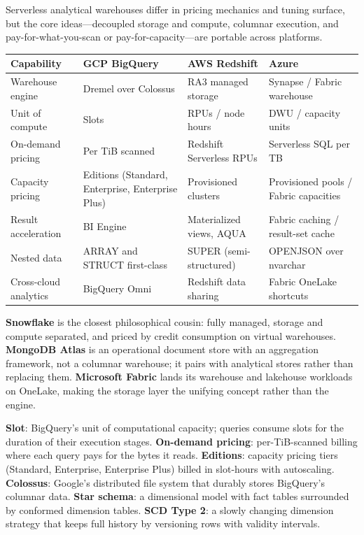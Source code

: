 \begin{crosscloud}
Serverless analytical warehouses differ in pricing mechanics and tuning surface, but the core ideas---decoupled storage and compute, columnar execution, and pay-for-what-you-scan or pay-for-capacity---are portable across platforms.

\vspace{2mm}
{\footnotesize
\begin{tabular}{@{}p{2.8cm}p{3.0cm}p{3.0cm}p{3.0cm}@{}} \\
\toprule
\textbf{Capability} & \textbf{GCP BigQuery} & \textbf{AWS Redshift} & \textbf{Azure} \\
\midrule
Warehouse engine & Dremel over Colossus & RA3 managed storage & Synapse / Fabric warehouse \\
Unit of compute & Slots & RPUs / node hours & DWU / capacity units \\
On-demand pricing & Per TiB scanned & Redshift Serverless RPUs & Serverless SQL per TB \\
Capacity pricing & Editions (Standard, Enterprise, Enterprise Plus) & Provisioned clusters & Provisioned pools / Fabric capacities \\
Result acceleration & BI Engine & Materialized views, AQUA & Fabric caching / result-set cache \\
Nested data & ARRAY and STRUCT first-class & SUPER (semi-structured) & OPENJSON over nvarchar \\
Cross-cloud analytics & BigQuery Omni & Redshift data sharing & Fabric OneLake shortcuts \\
\bottomrule
\end{tabular}}

\vspace{1mm}
\textbf{Snowflake} is the closest philosophical cousin: fully managed, storage and compute separated, and priced by credit consumption on virtual warehouses. \textbf{MongoDB Atlas} is an operational document store with an aggregation framework, not a columnar warehouse; it pairs with analytical stores rather than replacing them. \textbf{Microsoft Fabric} lands its warehouse and lakehouse workloads on OneLake, making the storage layer the unifying concept rather than the engine.
\end{crosscloud}

\begin{keyterms}
\textbf{Slot}: BigQuery's unit of computational capacity; queries consume slots for the duration of their execution stages.
\textbf{On-demand pricing}: per-TiB-scanned billing where each query pays for the bytes it reads.
\textbf{Editions}: capacity pricing tiers (Standard, Enterprise, Enterprise Plus) billed in slot-hours with autoscaling.
\textbf{Colossus}: Google's distributed file system that durably stores BigQuery's columnar data.
\textbf{Star schema}: a dimensional model with fact tables surrounded by conformed dimension tables.
\textbf{SCD Type 2}: a slowly changing dimension strategy that keeps full history by versioning rows with validity intervals.
\end{keyterms}

